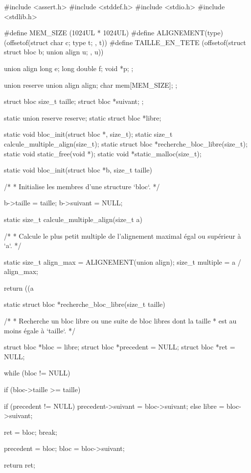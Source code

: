 \begin{C}
#include <assert.h>
#include <stddef.h>
#include <stdio.h>
#include <stdlib.h>

#define MEM_SIZE (1024UL * 1024UL)
#define ALIGNEMENT(type) (offsetof(struct { char c; type t; }, t))
#define TAILLE_EN_TETE (offsetof(struct { struct bloc b; union align u; }, u))

union align
{
    long e;
    long double f;
    void *p;
};

union reserve
{
    union align align;
    char mem[MEM_SIZE];
};

struct bloc
{
    size_t taille;
    struct bloc *suivant;
};


static union reserve reserve;
static struct bloc *libre;

static void bloc_init(struct bloc *, size_t);
static size_t calcule_multiple_align(size_t);
static struct bloc *recherche_bloc_libre(size_t);
static void static_free(void *);
static void *static_malloc(size_t);


static void bloc_init(struct bloc *b, size_t taille)
{
    /*
     * Initialise les membres d'une structure `bloc`.
     */

    b->taille = taille;
    b->suivant = NULL;
}


static size_t calcule_multiple_align(size_t a)
{
    /*
     * Calcule le plus petit multiple de l'alignement maximal égal ou supérieur à `a`.
     */

    static size_t align_max = ALIGNEMENT(union align);
    size_t multiple = a / align_max;

    return ((a %
}


static struct bloc *recherche_bloc_libre(size_t taille)
{
    /*
     * Recherche un bloc libre ou une suite de bloc libres dont la taille
     * est au moins égale à `taille`.
     */

    struct bloc *bloc = libre;
    struct bloc *precedent = NULL;
    struct bloc *ret = NULL;

    while (bloc != NULL)
    {
        if (bloc->taille >= taille)
        {
            if (precedent != NULL)
                precedent->suivant = bloc->suivant;
            else
                libre = bloc->suivant;

            ret = bloc;
            break;
        }

        precedent = bloc;
        bloc = bloc->suivant;
    }

    return ret;
}



\end{C}

